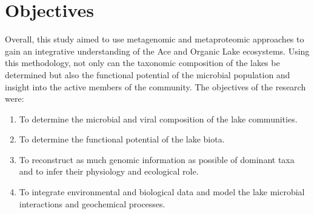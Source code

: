\section{Objectives}

Overall, this study aimed to use metagenomic and metaproteomic approaches to gain an integrative understanding of the Ace and Organic Lake ecosystems. 
Using this methodology, not only can the taxonomic composition of the lakes be determined but also the functional potential of the microbial population and insight into the active members of the community.
The objectives of the research were:

\begin{enumerate}
\item
  To determine the microbial and viral composition of the lake
  communities.

\item
  To determine the functional potential of the lake biota.

\item
  To reconstruct as much genomic information as possible of dominant taxa and to infer their physiology and ecological role.

\item
  To integrate environmental and biological data and model the lake microbial interactions and geochemical processes.

\end{enumerate}
